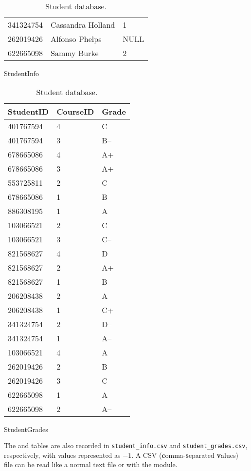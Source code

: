\begin{table}[H]
\begin{subtable}{0.55\textwidth}
\begin{subtable}{\textwidth}
\begin{tabular}{|l|l|l|}
            341324754 & Cassandra Holland & 1 \\
            262019426 & Alfonso Phelps & NULL \\
            622665098 & Sammy Burke & 2 \\ \hline
        \end{tabular}
        \caption{StudentInfo}
        \label{table:sql1-student-info}
    \end{subtable}
\end{subtable}
\hfil
\begin{subtable}{.35\textwidth}
    \centering
    \footnotesize
    \begin{tabular}{|l|l|l|}
        \hline StudentID & CourseID & Grade \\ \hline
        401767594 & 4 & C \\
        401767594 & 3 & B-- \\
        678665086 & 4 & A+ \\
        678665086 & 3 & A+ \\
        553725811 & 2 & C \\
        678665086 & 1 & B \\
        886308195 & 1 & A \\
        103066521 & 2 & C \\
        103066521 & 3 & C-- \\
        821568627 & 4 & D \\
        821568627 & 2 & A+ \\
        821568627 & 1 & B \\
        206208438 & 2 & A \\
        206208438 & 1 & C+ \\
        341324754 & 2 & D-- \\
        341324754 & 1 & A-- \\
        103066521 & 4 & A \\
        262019426 & 2 & B \\
        262019426 & 3 & C \\
        622665098 & 1 & A \\
        622665098 & 2 & A-- \\ \hline
    \end{tabular}
    \caption{StudentGrades}
    \label{table:sql1-student-grades}
\end{subtable}
\caption{Student database.}
\end{table}

The  and  tables are also recorded in \texttt{student\_info.csv} and \texttt{student\_grades.csv}, respectively, with  values represented as $-1$.
A CSV (\textbf{c}omma-\textbf{s}eparated \textbf{v}alues) file can be read like a normal text file or with the  module.


